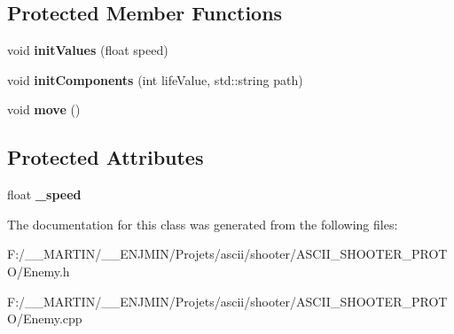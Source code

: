 \subsection*{Protected Member Functions}
\begin{DoxyCompactItemize}
\item 
\hypertarget{class_enemy_a304c3d98161d2ebca4ddd8ce1ae974af}{}\label{class_enemy_a304c3d98161d2ebca4ddd8ce1ae974af} 
void {\bfseries init\+Values} (float speed)
\item 
\hypertarget{class_enemy_ae8740856fd04d64259d0bad0eb7ae3ce}{}\label{class_enemy_ae8740856fd04d64259d0bad0eb7ae3ce} 
void {\bfseries init\+Components} (int life\+Value, std\+::string path)
\item 
\hypertarget{class_enemy_a9a398f8d12234f02563b27440aff7891}{}\label{class_enemy_a9a398f8d12234f02563b27440aff7891} 
void {\bfseries move} ()
\end{DoxyCompactItemize}
\subsection*{Protected Attributes}
\begin{DoxyCompactItemize}
\item 
\hypertarget{class_enemy_a5ad8a827b28dd24331a434d1993d5c01}{}\label{class_enemy_a5ad8a827b28dd24331a434d1993d5c01} 
float {\bfseries \+\_\+speed}
\end{DoxyCompactItemize}


The documentation for this class was generated from the following files\+:\begin{DoxyCompactItemize}
\item 
F\+:/\+\_\+\+\_\+\+M\+A\+R\+T\+I\+N/\+\_\+\+\_\+\+E\+N\+J\+M\+I\+N/\+Projets/ascii/shooter/\+A\+S\+C\+I\+I\+\_\+\+S\+H\+O\+O\+T\+E\+R\+\_\+\+P\+R\+O\+T\+O/Enemy.\+h\item 
F\+:/\+\_\+\+\_\+\+M\+A\+R\+T\+I\+N/\+\_\+\+\_\+\+E\+N\+J\+M\+I\+N/\+Projets/ascii/shooter/\+A\+S\+C\+I\+I\+\_\+\+S\+H\+O\+O\+T\+E\+R\+\_\+\+P\+R\+O\+T\+O/Enemy.\+cpp\end{DoxyCompactItemize}
